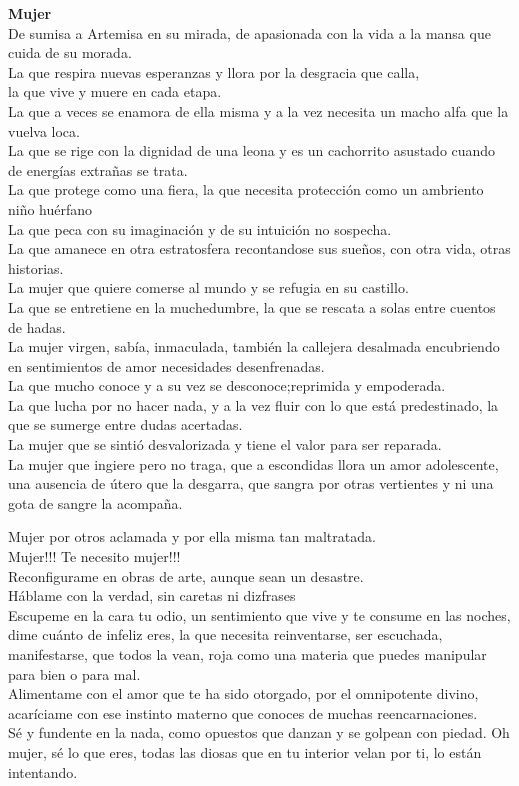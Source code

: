 \documentclass[12pt, a4paper, twoside]{book} %
\begin{document}
\noindent\textbf{Mujer}\\
De sumisa a Artemisa en su mirada, de apasionada con la vida a la mansa que cuida de su morada.\\
La que respira nuevas esperanzas y llora por la desgracia que calla,\\
la que vive y muere en cada etapa.\\
La que a veces se enamora de ella misma y a la vez necesita un macho alfa que la vuelva loca.\\
La que se rige con la dignidad de una leona y es un cachorrito asustado cuando de energías extrañas se trata.\\
La que protege como una fiera, la que necesita protección como un ambriento niño huérfano\\
La que peca con su imaginación y de su intuición no sospecha.\\
La que amanece en otra estratosfera recontandose sus sueños, con otra vida, otras historias.\\
La mujer que quiere comerse al mundo y se refugia en su castillo.\\
La que se entretiene en la muchedumbre, la que se rescata a solas entre cuentos de hadas.\\
La mujer virgen, sabía, inmaculada, también la callejera desalmada encubriendo en sentimientos de amor necesidades desenfrenadas.\\
La que mucho conoce y a su vez se desconoce;reprimida y empoderada.\\
La que lucha por no hacer nada, y a la vez fluir con lo que está predestinado, la que se sumerge entre dudas acertadas.\\
La mujer que se sintió desvalorizada y tiene el valor para ser reparada.\\
La mujer que ingiere pero no traga, que a escondidas llora un amor adolescente, una ausencia de útero que la desgarra, que sangra por otras vertientes y ni una gota de sangre la acompaña.

\clearpage

\noindent Mujer por otros aclamada y por ella misma tan maltratada.\\
Mujer!!! Te necesito mujer!!!\\
Reconfigurame en obras de arte, aunque sean un desastre.\\
Háblame con la verdad, sin caretas ni dizfrases\\
Escupeme en la cara tu odio, un sentimiento que vive y te consume en las noches, dime cuánto de infeliz eres, la que necesita reinventarse, ser escuchada, manifestarse, que todos la vean, roja como una materia que puedes manipular para bien o para mal.\\
Alimentame con el amor que te ha sido otorgado, por el omnipotente divino, acaríciame con ese instinto materno que conoces de muchas reencarnaciones.\\
Sé y fundente en la nada, como opuestos que danzan y se golpean con piedad.
Oh mujer, sé lo que eres, todas las diosas que en tu interior velan por ti, lo están intentando.
\end{document}
